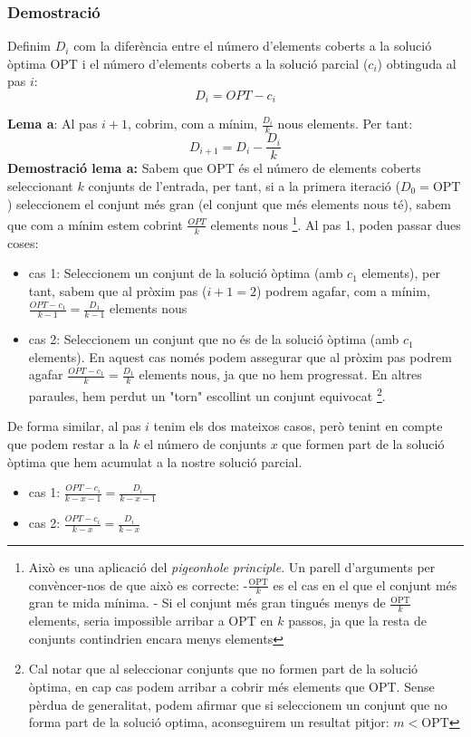 \documentclass{article}
\begin{document}
\subsubsection{Demostració}
Definim $D_i$ com la diferència entre el número d'elements coberts a la solució òptima OPT i el número d'elements coberts a la solució parcial ($c_i$) obtinguda al pas $i$:
\[
D_i = OPT-c_i
\]
\par
\textbf{Lema a}: Al pas $i+1$, cobrim, com a mínim, $\frac{D_i}{k}$ nous elements. Per tant:
\[
D_{i+1} = D_i - \frac{D_i}{k}
\]
\textbf{Demostració lema a:}
\newline
Sabem que OPT és el número de elements coberts seleccionant $k$ conjunts de l'entrada, per tant, si a la primera iteració ($D_0=\text{OPT}$) seleccionem el conjunt més gran (el conjunt que més elements nous té), sabem que com a mínim estem cobrint $\frac{OPT}{k}$ elements nous 
\footnote{Això es una aplicació del \textit{pigeonhole principle}. Un parell d'arguments per convèncer-nos de que això es correcte: \newline -$\frac{\text{OPT}}{k}$ es el cas en el que el conjunt més gran te mida mínima. \newline - Si el conjunt més gran tingués menys de $\frac{\text{OPT}}{k}$ elements, seria impossible arribar a OPT en $k$ passos, ja que la resta de conjunts contindrien encara menys elements\newline}.
\newline
Al pas 1, poden passar dues coses:
\begin{itemize}
    \item cas 1: Seleccionem un conjunt de la solució òptima (amb $c_1$ elements), per tant, sabem que al pròxim pas ($i+1=2$) podrem agafar, com a mínim, $\frac{OPT-c_1}{k-1}=\frac{D_1}{k-1}$ elements nous
    \item cas 2: Seleccionem un conjunt que no és de la solució òptima (amb $c_1$ elements). En aquest cas només podem assegurar que al pròxim pas podrem agafar $\frac{OPT-c_1}{k}=\frac{D_1}{k}$ elements nous, ja que no hem progressat. En altres paraules, hem perdut un "torn" escollint un conjunt equivocat    \footnote{Cal notar que al seleccionar conjunts que no formen part de la solució òptima, en cap cas podem arribar a cobrir més elements que OPT. Sense pèrdua de generalitat, podem afirmar que si seleccionem un conjunt que no forma part de la solució optima, aconseguirem un resultat pitjor: $m < \text{OPT}$}.
\end{itemize}
De forma similar, al pas $i$ tenim els dos mateixos casos, però tenint en compte que podem restar a la $k$ el número de conjunts $x$ que formen part de la solució òptima que hem acumulat a la nostre solució parcial.
\begin{itemize}
    \item cas 1: $\frac{OPT-c_i}{k-x-1}=\frac{D_i}{k-x-1}$
    \item cas 2: $\frac{OPT-c_i}{k-x}=\frac{D_i}{k-x}$
\end{itemize}
\end{document}
